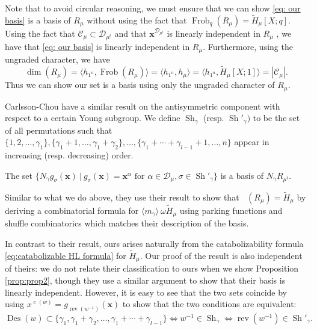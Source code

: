 \documentclass[ALCO, Unicode]{cedram}
\DeclareMathOperator{\Frob}{Frob}
\DeclareMathOperator{\sh}{Sh}
\DeclareMathOperator{\rev}{rev}
\DeclareMathOperator{\cw}{c}
\DeclareMathOperator{\des}{Des}
\DeclareMathOperator{\Frobq}{\Frob_q}
\newcommand{\mHL}{\tilde{H}}
\begin{document}
\begin{rema}
    Note that to avoid circular reasoning, we must ensure that we can show \eqref{eq: our basis} is a basis of $R_\mu$ without using the fact that $\Frob_q(R_\mu) =\mHL_\mu[X;q]$. Using the fact that $\mathcal{C}_\mu\subset \mathcal{D}_{\mu^t}$ and that $\mathbf{x}^{\mathcal{D}_{\mu^t}}$ is linearly independent in $R_\mu$ \cite[Corollary 3.14]{CC}, we have that \eqref{eq: our basis} is linearly independent in $R_\mu$. Furthermore, using the ungraded character, we have
    \[\dim(R_\mu) = \langle h_{1^n}, \Frob(R_\mu)\rangle = \langle h_{1^n}, h_\mu \rangle = \langle h_{1^n}, \tilde{H}_\mu[X;1] \rangle =|\mathcal{C}_\mu|. \]
    Thus we can show our set is a basis using only the ungraded character of $R_\mu$.
\end{rema}

Carlsson-Chou \cite{CC} have a similar result on the antisymmetric component with respect to a certain Young subgroup. 
We define $\sh_\gamma$ (resp. $\sh'_\gamma)$ to be the set of all permutations such that $\{1,2,\dots, \gamma_1\}, \{\gamma_1+1,\dots, \gamma_1+\gamma_2\}, \dots, \{\gamma_1+\cdots + \gamma_{l-1} + 1, \dots, n\}$ appear in increasing (resp. decreasing) order.

\begin{thm}
    The set $\{N_\gamma g_\sigma(\mathbf{x}) \ | \  g_\sigma(\mathbf{x}) = \mathbf{x}^\alpha \text{ for }\alpha\in \mathcal{D}_\mu, \sigma \in \sh'_{\gamma}\}$ is a basis of $N_\gamma R_{\mu^t}$.
\end{thm}
Similar to what we do above, they use their result to show that $\Frobq(R_{\mu}) = \mHL_{\mu}$ by deriving a combinatorial formula for $\langle m_\gamma\rangle  \  \omega \mHL_{\mu}$ using parking functions and shuffle combinatorics which matches their description of the basis.

In contrast to their result, ours arises naturally from the catabolizability formula \eqref{eq:catabolizable HL formula} for $\mHL_{\mu}$. 
Our proof of the result is also independent of theirs: we do not relate their classification to ours when we show Proposition \ref{prop:prop2}, though they use a similar argument to show that their basis is linearly independent. 
However, it is easy to see that the two sets coincide by using $x^{\cw(w)} = g_{\rev(w^{-1})}(\mathbf{x})$ to show that the two conditions are equivalent:
\[\des(w) \subset \{\gamma_1,\gamma_1 + \gamma_2, \dots, \gamma_1 + \cdots + \gamma_{l-1}\} \Leftrightarrow w^{-1} \in \sh_\gamma  \Leftrightarrow \rev(w^{-1}) \in \sh'_\gamma.\]
\end{document}
